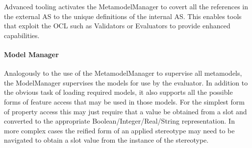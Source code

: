 \documentclass{jot}
\begin{document}
Advanced tooling activates the MetamodelManager to covert all the references in the external AS to the unique definitions of the internal AS. This enables tools that exploit the OCL such as Validators or Evaluators to provide enhanced capabilities.

\paragraph{Model Manager}

Analogously to the use of the MetamodelManager to supervise all metamodels, the ModelManager supervises the models for use by the evaluator. In addition to the obvious task of loading required models, it also supports all the possible forms of feature access that may be used in those models. For the simplest form of property access this may just require that a value be obtained from a slot and converted to the appropriate Boolean/Integer/Real/String representation. In more complex cases the reified form of an applied stereotype may need to be navigated to obtain a slot value from the instance of the stereotype.




\end{document}
